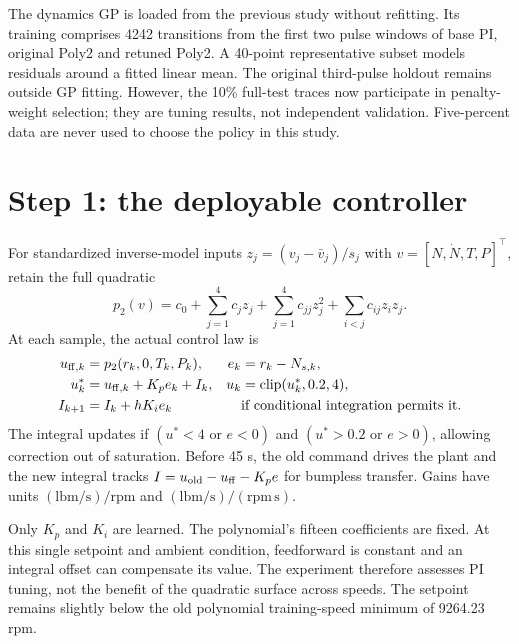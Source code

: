 \documentclass[11pt,a4paper]{article}
\begin{document}
The dynamics GP is loaded from the previous study without refitting. Its training comprises 4242 transitions from the first two pulse windows of base PI, original Poly2 and retuned Poly2. A 40-point representative subset models residuals around a fitted linear mean. The original third-pulse holdout remains outside GP fitting. However, the 10\% full-test traces now participate in penalty-weight selection; they are tuning results, not independent validation. Five-percent data are never used to choose the policy in this study.

\section{Step 1: the deployable controller}
For standardized inverse-model inputs $z_j=(v_j-\bar v_j)/s_j$ with $v=[N,\dot N,T,P]^\top$, retain the full quadratic
\begin{equation}
p_2(v)=c_0+\sum_{j=1}^4c_jz_j+\sum_{j=1}^4c_{jj}z_j^2+\sum_{i<j}c_{ij}z_iz_j.
\end{equation}
At each sample, the actual control law is
\begin{align}
u_{{\rm ff},k}&=p_2(r_k,0,T_k,P_k),& e_k&=r_k-N_{s,k},\\
u_k^*&=u_{{\rm ff},k}+K_pe_k+I_k,&u_k&=\operatorname{clip}(u_k^*,0.2,4),\\
I_{k+1}&=I_k+hK_ie_k&&\text{if conditional integration permits it.}
\end{align}
The integral updates if $(u^*<4\text{ or }e<0)$ and $(u^*>0.2\text{ or }e>0)$, allowing correction out of saturation. Before 45 s, the old command drives the plant and the new integral tracks $I=u_{\rm old}-u_{\rm ff}-K_pe$ for bumpless transfer. Gains have units $(\mathrm{lbm/s})/\mathrm{rpm}$ and $(\mathrm{lbm/s})/(\mathrm{rpm\,s})$.

Only $K_p$ and $K_i$ are learned. The polynomial's fifteen coefficients are fixed. At this single setpoint and ambient condition, feedforward is constant and an integral offset can compensate its value. The experiment therefore assesses PI tuning, not the benefit of the quadratic surface across speeds. The setpoint remains slightly below the old polynomial training-speed minimum of 9264.23 rpm.
\end{document}
